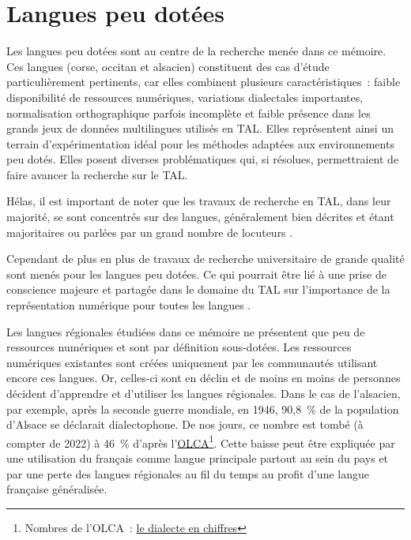 \chapter{Langues peu dotées}

Les langues peu dotées sont au centre de la recherche menée dans ce mémoire. Ces langues (corse,
occitan et alsacien) constituent des cas d’étude particulièrement pertinents, car elles combinent
plusieurs caractéristiques~: faible disponibilité de ressources numériques, variations dialectales
importantes, normalisation orthographique parfois incomplète et faible présence dans les grands
jeux de données multilingues utilisés en TAL. Elles représentent ainsi un terrain d’expérimentation
idéal pour les méthodes adaptées aux environnements peu dotés. Elles posent
diverses problématiques qui, si résolues, permettraient de faire avancer la recherche sur le TAL.

Hélas, il est important de noter que les travaux de recherche en TAL, dans leur majorité, se sont concentrés
sur des langues, généralement bien décrites et étant majoritaires ou parlées par un grand nombre de locuteurs \citep{delgratta_2014, bernhard_2018}.

Cependant de plus en plus de travaux de recherche universitaire de grande qualité sont menés
pour les langues peu dotées. Ce qui pourrait être lié à une prise de conscience majeure et partagée dans le domaine du TAL
sur l’importance de la représentation numérique pour toutes les langues \citep{bernhard_2018}.

Les langues régionales étudiées dans ce mémoire ne présentent que peu de ressources numériques et sont par définition sous-dotées. Les ressources numériques
existantes sont créées uniquement par les communautés utilisant encore ces langues. Or, celles-ci sont en déclin et de moins
en moins de personnes décident d'apprendre et d'utiliser les langues régionales. Dans le cas de l'alsacien, par exemple, après la seconde
guerre mondiale, en 1946, 90,8~\% de la population d'Alsace se déclarait dialectophone. De nos jours, ce nombre est tombé
(à compter de 2022) à 46~\% d'après l'\href{https://www.olcalsace.org/}{OLCA}\footnote{
    Nombres de l'OLCA~: \href{https://www.olcalsace.org/fr/observer-et-veiller/le-dialecte-en-chiffres}{le dialecte en chiffres}}.
Cette baisse peut être expliquée par une utilisation du français comme
langue principale partout au sein du pays et par une perte des langues régionales au fil du temps au profit d'une langue
française généralisée.

